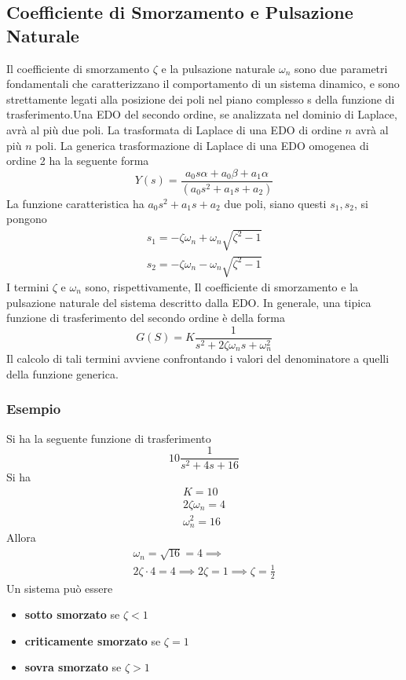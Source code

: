 \documentclass[10pt, letterpaper]{report}
\begin{document}
\subsection{Coefficiente di Smorzamento e Pulsazione Naturale}
Il coefficiente di smorzamento $\zeta$ e la pulsazione naturale $\omega_n$
sono due parametri fondamentali che caratterizzano il comportamento 
di un sistema dinamico, e sono strettamente legati alla posizione dei
poli nel piano complesso s della funzione di trasferimento.\acc Una EDO del secondo ordine, se analizzata 
nel dominio di Laplace, avrà al più due poli.\acc 
\claim{} La trasformata di Laplace di una EDO di ordine $n$ avrà al più $n$ poli.\acc 
La generica trasformazione di Laplace di una EDO omogenea di ordine 2 ha la seguente forma 
$$ Y(s)=\frac{a_0s\alpha+a_0\beta+a_1\alpha}{(a_0s^2+a_1s+a_2)}$$
La funzione caratteristica ha $a_0s^2+a_1s+a_2$ due poli, siano questi $s_1,s_2$, si pongono 
$$ \begin{matrix}
    s_1=-\zeta\omega_n+\omega_n\sqrt{\zeta^2-1}\\ 
    s_2=-\zeta\omega_n-\omega_n\sqrt{\zeta^2-1}
\end{matrix}$$
I termini $\zeta$ e $\omega_n$ sono, rispettivamente, Il coefficiente di smorzamento e la pulsazione naturale del 
sistema descritto dalla EDO. In generale, una tipica funzione di trasferimento del secondo ordine 
è della forma 
$$ 
G(S)=K\frac{1}{s^2+2\zeta\omega_ns+\omega_n^2}
$$
Il calcolo di tali termini avviene confrontando i valori del denominatore a quelli della funzione 
generica.\subsubsection{Esempio}  Si ha la seguente funzione di trasferimento 
$$ 10\frac{1}{s^2+4s+16}$$
Si ha 
$$\begin{matrix}
    K=10\\ 2\zeta\omega_n=4\\\omega_n^2=16
\end{matrix} $$
Allora\begin{eqnarray}
    \omega_n=\sqrt{16}=4\implies \\ 
    2\zeta\cdot 4=4\implies 2\zeta=1 \implies \zeta  = \frac{1}{2}
\end{eqnarray}
Un sistema può essere\begin{itemize}
    \item \textbf{sotto smorzato} se $\zeta<1$
    \item \textbf{criticamente smorzato}  se $\zeta=1$
    \item \textbf{sovra smorzato} se $\zeta>1$
\end{itemize}
\end{document}
